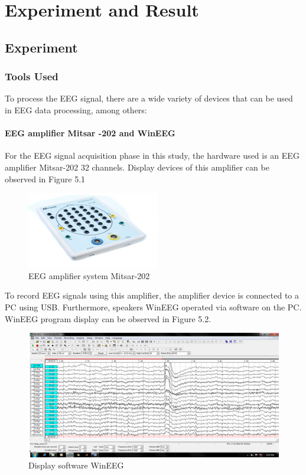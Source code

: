 \chapter{Experiment and Result}
\section{Experiment}
\subsection{Tools Used}
To process the EEG signal, there are a wide variety of devices that can be used in EEG data processing, among others:

\subsubsection{EEG amplifier Mitsar -202 and WinEEG}
For the EEG signal acquisition phase in this study, the hardware used is an EEG amplifier Mitsar-202 32 channels. Display devices of this amplifier can be observed in Figure 5.1
\begin{figure}[h!]
\centering
\includegraphics[scale=0.5]{figures/51.PNG}
\caption{EEG amplifier system Mitsar-202}
\label{labelgambar5}
\end{figure}

\par
To record EEG signals using this amplifier, the amplifier device is connected to a PC using USB. Furthermore, speakers WinEEG operated via software on the PC. WinEEG program display can be observed in Figure 5.2.
\begin{figure}[h!]
\centering
\includegraphics[scale=0.5]{figures/52.PNG}
\caption{Display software WinEEG}
\label{labelgambar6}
\end{figure}

